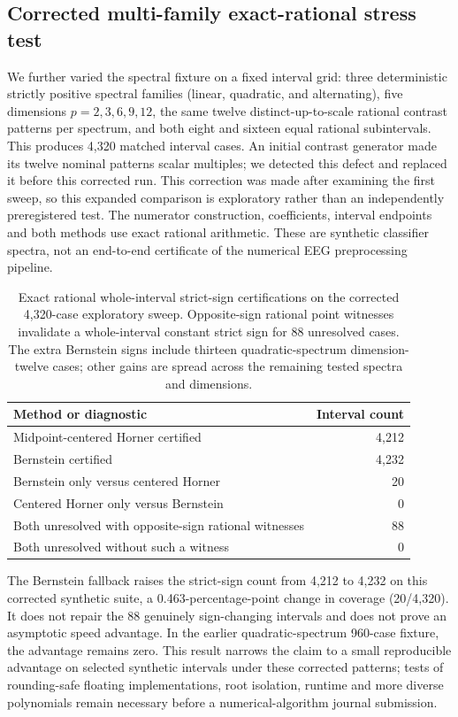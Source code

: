\FloatBarrier
\subsection{Corrected multi-family exact-rational stress test}
\label{sec:p4-multifamily}
We further varied the spectral fixture on a fixed interval grid: three deterministic strictly
positive spectral families (linear, quadratic, and alternating),
five dimensions $p=2,3,6,9,12$, the same twelve distinct-up-to-scale rational
contrast patterns per spectrum, and both eight and sixteen equal
rational subintervals. This produces 4,320 matched interval cases. An initial
contrast generator made its twelve nominal patterns scalar multiples;
we detected this defect and replaced it before this corrected run.
This correction was made after examining the first sweep, so this
expanded comparison is exploratory rather than an independently
preregistered test.
The numerator construction, coefficients, interval endpoints and
both methods use exact rational arithmetic. These are synthetic
classifier spectra, not an end-to-end certificate of the numerical
EEG preprocessing pipeline.

\begin{table}[ht]\centering\small
\caption{Exact rational whole-interval strict-sign certifications
on the corrected 4,320-case exploratory sweep. Opposite-sign rational
point witnesses invalidate a whole-interval constant strict sign for
88 unresolved cases. The extra Bernstein signs include thirteen
quadratic-spectrum dimension-twelve cases; other gains are spread
across the remaining tested spectra and dimensions.}
\label{tab:p4-multifamily}
\begin{tabular}{lr}\toprule
Method or diagnostic & Interval count\\\midrule
Midpoint-centered Horner certified & 4,212\\
Bernstein certified & 4,232\\
Bernstein only versus centered Horner & 20\\
Centered Horner only versus Bernstein & 0\\
Both unresolved with opposite-sign rational witnesses & 88\\
Both unresolved without such a witness & 0\\
\bottomrule\end{tabular}
\end{table}

The Bernstein fallback raises the
strict-sign count from 4,212 to 4,232 on this corrected
synthetic suite, a 0.463-percentage-point change in
coverage (20/4,320). It does not repair the 88 genuinely
sign-changing intervals and does not prove an asymptotic
speed advantage. In the earlier quadratic-spectrum 960-case
fixture, the advantage remains zero. This result narrows the
claim to a small reproducible advantage on selected synthetic
intervals under these corrected patterns; tests of rounding-safe floating implementations,
root isolation, runtime and more diverse polynomials remain
necessary before a numerical-algorithm journal submission.
